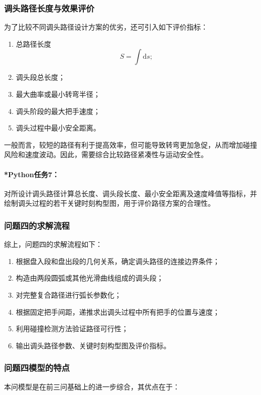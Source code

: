 \documentclass[12pt,a4paper]{ctexart}
\newcommand{\dif}{\mathrm{d}}
\begin{document}
\subsubsection{调头路径长度与效果评价}
为了比较不同调头路径设计方案的优劣，还可引入如下评价指标：

\begin{enumerate}
    \item 总路径长度
    \begin{equation}
    S=\int \dif s;
    \end{equation}
    \item 调头段总长度；
    \item 最大曲率或最小转弯半径；
    \item 调头阶段的最大把手速度；
    \item 调头过程中最小安全距离。
\end{enumerate}

一般而言，较短的路径有利于提高效率，但可能导致转弯更加急促，从而增加碰撞风险和速度波动。因此，需要综合比较路径紧凑性与运动安全性。

\paragraph{*Python任务7：}
对所设计调头路径计算总长度、调头段长度、最小安全距离及速度峰值等指标，并绘制调头过程的若干关键时刻构型图，用于评价路径方案的合理性。

\subsubsection{问题四的求解流程}
综上，问题四的求解流程如下：

\begin{enumerate}
    \item 根据盘入段和盘出段的几何关系，确定调头路径的连接边界条件；
    \item 构造由两段圆弧或其他光滑曲线组成的调头段；
    \item 对完整复合路径进行弧长参数化；
    \item 根据固定把手间距，递推求出调头过程中所有把手的位置与速度；
    \item 利用碰撞检测方法验证路径可行性；
    \item 输出调头路径参数、关键时刻构型图及评价指标。
\end{enumerate}

\subsubsection{问题四模型的特点}
本问模型是在前三问基础上的进一步综合，其优点在于：
\end{document}
